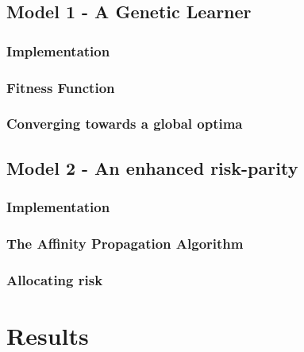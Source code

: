 \documentclass[12pt]{article} %
\numberwithin{equation}{subsection}
\begin{document}
\subsection{Model 1 - A Genetic Learner}




\subsubsection{Implementation}



\subsubsection{Fitness Function}



\subsubsection{Converging towards a global optima}



\subsection{Model 2 - An enhanced risk-parity}



\subsubsection{Implementation}




\subsubsection{The Affinity Propagation Algorithm}

\subsubsection{Allocating risk}



\section*{Results}
\end{document}

